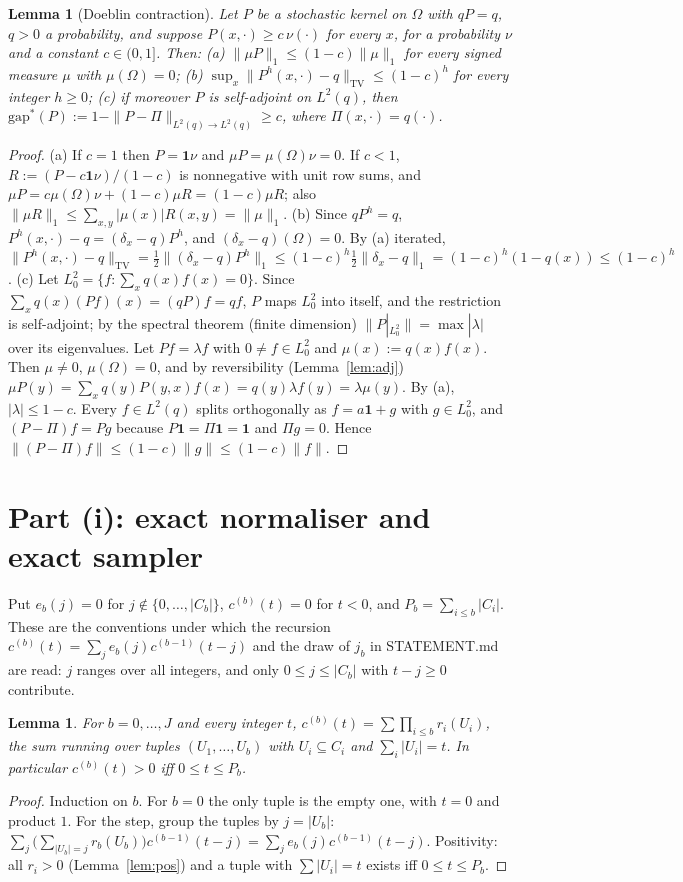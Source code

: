 \documentclass[11pt]{article}
\newtheorem{lemma}[theorem]{Lemma}
\theoremstyle{remark}
\newcommand{\Om}{\Omega}
\newcommand{\gs}{\mathrm{gap}^*}
\newcommand{\TV}{\mathrm{TV}}
\begin{document}
\begin{lemma}[Doeblin contraction]\label{lem:doeb}
Let $P$ be a stochastic kernel on $\Om$ with $qP=q$, $q>0$ a probability, and suppose $P(x,\cdot)\ge c\,\nu(\cdot)$ for every $x$, for a probability $\nu$ and a constant $c\in(0,1]$. Then:
(a) $\|\mu P\|_1\le(1-c)\|\mu\|_1$ for every signed measure $\mu$ with $\mu(\Om)=0$;
(b) $\sup_x\|P^h(x,\cdot)-q\|_{\TV}\le(1-c)^h$ for every integer $h\ge0$;
(c) if moreover $P$ is self-adjoint on $L^2(q)$, then $\gs(P):=1-\|P-\Pi\|_{L^2(q)\to L^2(q)}\ge c$, where $\Pi(x,\cdot)=q(\cdot)$.
\end{lemma}
\begin{proof}
(a) If $c=1$ then $P=\mathbf 1\nu$ and $\mu P=\mu(\Om)\nu=0$. If $c<1$, $R:=(P-c\mathbf 1\nu)/(1-c)$ is nonnegative with unit row sums, and $\mu P=c\mu(\Om)\nu+(1-c)\mu R=(1-c)\mu R$; also $\|\mu R\|_1\le\sum_{x,y}|\mu(x)|R(x,y)=\|\mu\|_1$.
(b) Since $qP^h=q$, $P^h(x,\cdot)-q=(\delta_x-q)P^h$, and $(\delta_x-q)(\Om)=0$. By (a) iterated, $\|P^h(x,\cdot)-q\|_\TV=\tfrac12\|(\delta_x-q)P^h\|_1\le(1-c)^h\tfrac12\|\delta_x-q\|_1=(1-c)^h(1-q(x))\le(1-c)^h$.
(c) Let $L^2_0=\{f:\sum_xq(x)f(x)=0\}$. Since $\sum_x q(x)(Pf)(x)=(qP)f=qf$, $P$ maps $L^2_0$ into itself, and the restriction is self-adjoint; by the spectral theorem (finite dimension) $\|P|_{L^2_0}\|=\max|\lambda|$ over its eigenvalues. Let $Pf=\lambda f$ with $0\ne f\in L^2_0$ and $\mu(x):=q(x)f(x)$. Then $\mu\ne0$, $\mu(\Om)=0$, and by reversibility (Lemma~\ref{lem:adj}) $\mu P(y)=\sum_x q(y)P(y,x)f(x)=q(y)\lambda f(y)=\lambda\mu(y)$. By (a), $|\lambda|\le1-c$. Every $f\in L^2(q)$ splits orthogonally as $f=a\mathbf 1+g$ with $g\in L^2_0$, and $(P-\Pi)f=Pg$ because $P\mathbf 1=\Pi\mathbf 1=\mathbf 1$ and $\Pi g=0$. Hence $\|(P-\Pi)f\|\le(1-c)\|g\|\le(1-c)\|f\|$.
\end{proof}

\section{Part (i): exact normaliser and exact sampler}

Put $e_b(j)=0$ for $j\notin\{0,\dots,|C_b|\}$, $c^{(b)}(t)=0$ for $t<0$, and $P_b=\sum_{i\le b}|C_i|$. These are the conventions under which the recursion $c^{(b)}(t)=\sum_je_b(j)c^{(b-1)}(t-j)$ and the draw of $j_b$ in STATEMENT.md are read: $j$ ranges over all integers, and only $0\le j\le|C_b|$ with $t-j\ge0$ contribute.

\begin{lemma}\label{lem:conv}
For $b=0,\dots,J$ and every integer $t$, $c^{(b)}(t)=\sum\prod_{i\le b}r_i(U_i)$, the sum running over tuples $(U_1,\dots,U_b)$ with $U_i\subseteq C_i$ and $\sum_i|U_i|=t$. In particular $c^{(b)}(t)>0$ iff $0\le t\le P_b$.
\end{lemma}
\begin{proof}
Induction on $b$. For $b=0$ the only tuple is the empty one, with $t=0$ and product $1$. For the step, group the tuples by $j=|U_b|$: $\sum_{j}\big(\sum_{|U_b|=j}r_b(U_b)\big)c^{(b-1)}(t-j)=\sum_je_b(j)c^{(b-1)}(t-j)$. Positivity: all $r_i>0$ (Lemma~\ref{lem:pos}) and a tuple with $\sum|U_i|=t$ exists iff $0\le t\le P_b$.
\end{proof}
\end{document}
